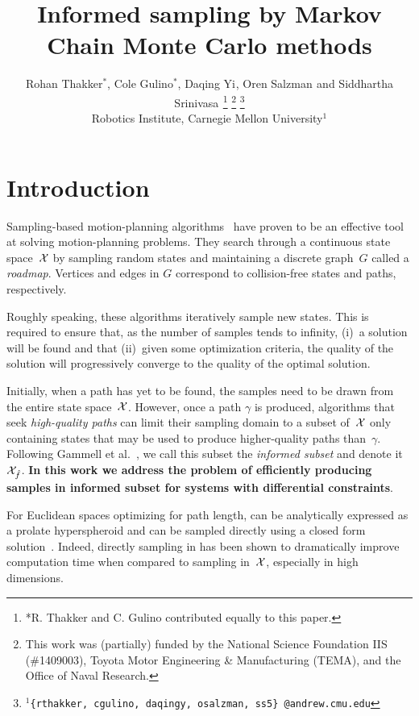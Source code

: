 \documentclass[letterpaper, 10 pt, conference]{ieeeconf}  %
\title{\LARGE \bf
Informed sampling by Markov Chain Monte Carlo methods
}
\author{
Rohan Thakker$^{*}$,
Cole Gulino$^{*}$,
Daqing Yi$^{}$,
Oren Salzman$^{}$ and
Siddhartha Srinivasa$^{}$%
\thanks{*R. Thakker and C. Gulino contributed equally to this paper.}
\thanks{This work was (partially) funded by the National Science Foundation IIS (\#1409003), Toyota Motor Engineering \& Manufacturing (TEMA), and the Office of Naval Research.}%
\thanks{$^{1}${\tt\small \{rthakker, cgulino, daqingy, osalzman, ss5\} @andrew.cmu.edu}}%
%
\\        
Robotics Institute, Carnegie Mellon University$^{1}$
}
\begin{document}
\maketitle
\thispagestyle{empty}
\pagestyle{empty}


\begin{abstract}

\end{abstract}


\section{Introduction}
\label{sec:intro}


Sampling-based motion-planning algorithms~\cite{CBHKKLT05, L06} have proven to be an effective tool at solving motion-planning problems.
They search through a continuous state space~$\mathcal{X}$ by sampling random states and maintaining a discrete graph~$G$ called a \emph{roadmap}.
Vertices and edges in $G$ correspond to collision-free states and paths, respectively.

Roughly speaking, these algorithms iteratively sample new states.
This is required to ensure that, as the number of samples tends to infinity, 
(i)~a solution will be found 
and that
(ii)~given some optimization criteria, the quality of the solution will progressively converge to the quality of the optimal solution.

Initially, 
when a path has yet to be found, 
the samples need to be drawn from the entire state space~$\mathcal{X}$.
However, once a path $\gamma$ is produced,  algorithms that seek \emph{high-quality paths} can limit their sampling domain to a subset of~$\mathcal{X}$ only  containing states that may be used to produce higher-quality paths than~$\gamma$.
Following Gammell et al.~\cite{GSB14}, we call this subset the \emph{informed subset} and denote it~$\mathcal{X}_{\hat{f}}$.
\textbf{In this work we address the problem of efficiently producing samples in informed subset for systems with differential constraints}. 

For Euclidean spaces optimizing for path length, 
\Cinf can be analytically expressed as a prolate hyperspheroid and can be sampled directly using a closed form solution~\cite{GSB14}.
Indeed, directly sampling in \Cinf has been shown to dramatically improve computation time when compared to sampling in~$\mathcal{X}$, especially in high dimensions. 
\end{document}
